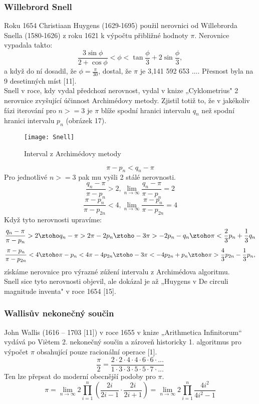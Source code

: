 \documentclass[rocnikovka]{gzwroc} %
\begin{document}
\subsubsection{Willebrord Snell}
Roku 1654 Christiaan Huygens (1629-1695) použil nerovnici od Willebrorda Snella (1580-1626) z roku 1621 k výpočtu přibližné hodnoty $\pi$. Nerovnice vypadala takto:
\begin{equation}
\frac{3\sin\phi}{2+\cos\phi}<\phi<\tan\frac{\phi}{3}+2\sin\frac{\phi}{3},
\end{equation}
a když do ní dosadil, že $\phi  = \frac{\pi}{30}$, dostal, že $\pi$ je 3,141 592 653 .... Přesnost byla na 9 desetinných míst [11].\\
Snell v roce, kdy vydal předchozí nerovnost, vydal v knize „Cyklometrius" 2 nerovnice zvyšující účinnost Archimédovy metody. Zjistil totiž to, že v jakékoliv fázi iterování pro $n>=3$ je $\pi$ blíže spodní hranici intervalu $q_n$ než spodní hranici intervalu $p_n$ (obrázek 17).
\begin{figure}[!ht]
\texttt{[image: Snell]}
\caption{Interval z Archimédovy metody}
\label{fig:kruh}
\end{figure}
$$
\pi-p_n<q_n-\pi
$$
Pro jednotlivé $n>=3$ pak mu vyšli 2 stálé nerovnosti.
\begin{equation}
\frac{q_n-\pi}{\pi-p_n}>2,  \lim_{n\to\infty} \frac{q_n-\pi}{\pi-p_n}=2
\end{equation}
\begin{equation}
\frac{\pi-p_n}{\pi-p_{2n}}<4,  \lim_{n\to\infty} \frac{\pi-p_n}{\pi-p_{2n}}=4
\end{equation}
Když tyto nerovnosti upravíme:
$$
\frac{q_n-\pi}{\pi-p_n}>2 \ztoho q_n-\pi>2\pi-2p_n \ztoho -3\pi>-2p_n-q_n \ztoho \pi<\frac{2}{3}p_n+\frac{1}{3}q_n
$$
$$
\frac{\pi-p_n}{\pi-p_{2n}}<4 \ztoho \pi-p_n<4\pi-4p_{2n} \ztoho -3\pi<-4p_{2n}+p_n \ztoho \pi>\frac{4}{3}p_{2n}-\frac{1}{3}p_n,
$$
získáme nerovnice pro výrazné zúžení intervalu z Archimédova algoritmu.\\
Snell sice tyto nerovnosti objevil, ale dokázal je až „Huygens v De circuli magnitude inventa" v roce 1654 [15].
\subsubsection{Wallisův nekonečný součin}
John Wallis (1616 – 1703 [11]) v roce 1655 v knize „Arithmetica Infinitorum“ vydává po Viètem 2. nekonečný součin a zároveň historicky 1. algoritmus pro výpočet $\pi$ obsahující pouze racionální operace [1].
\begin{equation}
\frac{\pi}{2}=\frac{2\cdot2\cdot4\cdot4\cdot6\cdot6\cdot...}{1\cdot3\cdot3\cdot5\cdot5\cdot7\cdot...}
\end{equation}
Ten lze přepsat do moderní obecnější podoby pro $\pi$.
$$
\pi=\lim_{n\to\infty}2\prod_{i=1}^{n} \left(\frac{2i}{2i-1}\cdot\frac{2i}{2i+1} \right)=\lim_{n\to\infty}2\prod_{i=1}^{n} \frac{4i^2}{4i^2-1}
$$
\end{document}
